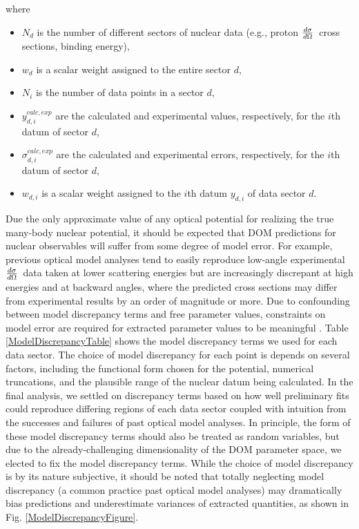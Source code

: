 \documentclass[twocolumn,secnumarabic,amssymb, nobibnotes, aps, prl,
superscriptaddress, nobalancelastpage]{revtex4}
\newcommand{\el}{\ensuremath{\frac{\lowercase{d}\sigma}{\lowercase{d}\Omega}}}
\begin{document}
where

\begin{itemize}

    \item $N_{d}$ is the number of different sectors of nuclear data (e.g., proton \el\ cross sections,
binding energy),
    \item $w_{d}$ is a scalar weight assigned to the entire sector $d$,
    \item $N_{i}$ is the number of data points in a sector $d$,
    \item $y^{calc, exp}_{d,i}$ are the calculated and experimental values,
        respectively, for the $i$th datum of sector $d$,
    \item $\sigma^{calc, exp}_{d,i}$ are the calculated and experimental errors,
        respectively, for the $i$th datum of sector $d$,
    \item $w_{d,i}$ is a scalar weight assigned to the $i$th datum
        $y_{d,i}$ of data sector $d$.
\end{itemize}

Due the only approximate value of any optical potential for realizing the true many-body 
nuclear potential, it should be expected that DOM predictions for nuclear observables
will suffer from some degree of model error. For example, previous
optical model analyses tend to easily reproduce low-angle experimental \el\ data taken at
lower scattering energies but are increasingly discrepant at high energies
and at backward angles, where the predicted cross sections may
differ from experimental results by an order of magnitude or more. Due to
confounding between model discrepancy terms and free parameter values, constraints on
model error are required for extracted parameter values to be meaningful
\cite{Brynjarsdottir2014}.
Table \ref{ModelDiscrepancyTable} shows the model discrepancy terms we used 
for each data sector. The choice of model discrepancy for each point
is depends on several factors, including the functional form chosen for the
potential, numerical truncations, and the plausible range of the nuclear datum being 
calculated. In the final analysis, we settled on discrepancy terms based
on how well preliminary fits could reproduce differing regions of each data sector
coupled with intuition from the successes and failures of past optical model analyses.
In principle, the form of these model discrepancy terms should also be treated as random
variables, but due to the already-challenging dimensionality of the DOM parameter space,
we elected to fix the model discrepancy terms.
While the choice of model discrepancy is by its nature subjective, it should be noted that
totally neglecting model discrepancy (a common practice past optical model
analyses) may dramatically bias predictions and underestimate variances of
extracted quantities, as shown in Fig. \ref{ModelDiscrepancyFigure}. 
\end{document}
